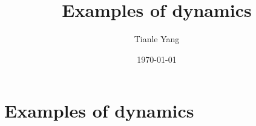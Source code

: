 \documentclass[sectionlevel=section,status=draft]{noteformyself}
\title{Examples of dynamics}
\author{Tianle Yang}
\date{\today}
\begin{document}
    \maketitle

    \section[
      status=draft,
      tag=00000,
      label=\labelNFM{sec:the-first-introduction:examples-of-dynamics}
    ]{Examples of dynamics}



\end{document}
